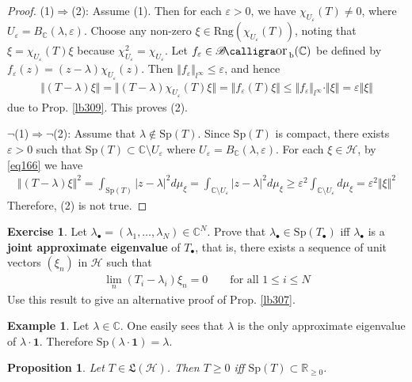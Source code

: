 \documentclass[12pt,b5paper,notitlepage]{article}
\theoremstyle{definition}
\newtheorem{eg}[df]{Example}
\newtheorem{exe}[df]{Exercise}
\theoremstyle{plain}
\newtheorem{pp}[df]{Proposition}
\DeclareMathOperator{\Borb}{{\mathscr{B}\text{\kern -2pt {\calligra\large or}}\,}_{\mathrm b}}
\newcommand{\fk}{\mathfrak}
\newcommand{\idt}{\mathbf{1}}
\newcommand{\blt}{\bullet}
\newcommand{\Cbb}{\mathbb C}
\newcommand{\Rbb}{\mathbb R}
\newcommand{\Sp}{\mathrm{Sp}}
\newcommand{\Rng}{\mathrm{Rng}}
\newcommand{\eps}{\varepsilon}
\newcommand{\MH}{\mathcal H}
\numberwithin{equation}{section}
\begin{document}
\begin{proof}
(1)$\Rightarrow$(2): Assume (1). Then for each $\eps>0$, we have $\chi_{U_\eps}(T)\neq0$, where $U_\eps=B_\Cbb(\lambda,\eps)$. Choose any non-zero $\xi\in\Rng(\chi_{U_\eps}(T))$, noting that $\xi=\chi_{U_\eps}(T)\xi$ because $\chi_{U_\eps}^2=\chi_{U_\eps}$. Let $f_\eps\in\Borb(\Cbb)$ be defined by $f_\eps(z)=(z-\lambda)\chi_{U_\eps}(z)$. Then $\Vert f_\eps\Vert_{l^\infty}\leq\eps$, and hence
\begin{align*}
\Vert (T-\lambda)\xi\Vert=\Vert (T-\lambda)\chi_{U_\eps}(T)\xi\Vert=\Vert f_\eps(T)\xi\Vert\leq \Vert f_\eps\Vert_{l^\infty}\cdot\Vert\xi\Vert=\eps\Vert\xi\Vert
\end{align*}
due to Prop. \ref{lb309}. This proves (2).

$\neg$(1)$\Rightarrow$$\neg$(2): Assume that $\lambda\notin\Sp(T)$. Since $\Sp(T)$ is compact, there exists $\eps>0$ such that $\Sp(T)\subset\Cbb\setminus U_\eps$ where $U_\eps=B_\Cbb(\lambda,\eps)$. For each $\xi\in\MH$, by \eqref{eq166} we have
\begin{align*}
\Vert(T-\lambda)\xi\Vert^2=\int_{\Sp(T)}|z-\lambda|^2d\mu_\xi=\int_{\Cbb\setminus U_\eps}|z-\lambda|^2d\mu_\xi\geq\eps^2\int_{\Cbb\setminus U_\eps}d\mu_\xi=\eps^2\Vert\xi\Vert^2
\end{align*}
Therefore, (2) is not true.
\end{proof}


\begin{exe}
Let $\lambda_\blt=(\lambda_1,\dots,\lambda_N)\in\Cbb^N$. Prove that $\lambda_\blt\in\Sp(T_\blt)$ iff $\lambda_\blt$ is a \textbf{joint approximate eigenvalue}  of $T_\blt$, that is, there exists a sequence of unit vectors $(\xi_n)$ in $\MH$ such that
\begin{align*}
\lim_n (T_i-\lambda_i)\xi_n=0\qquad\text{for all }1\leq i\leq N
\end{align*}
Use this result to give an alternative proof of Prop. \ref{lb307}.
\end{exe}


\begin{eg}
Let $\lambda\in\Cbb$. One easily sees that $\lambda$ is the only approximate eigenvalue of $\lambda\cdot \idt$. Therefore $\Sp(\lambda\cdot\idt)=\lambda$.
\end{eg}

\begin{pp}\label{lb313}
Let $T\in\fk L(\MH)$. Then $T\geq0$ iff $\Sp(T)\subset\Rbb_{\geq0}$.
\end{pp}
\end{document}
